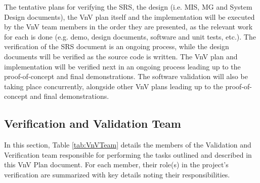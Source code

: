 \documentclass[12pt, titlepage]{article}
\begin{document}
The tentative plans for verifying the SRS, the design (i.e. MIS, MG and System Design documents), the VnV plan itself and the implementation will be executed by the VnV team members in the order they are presented, as the relevant work for each is done (e.g. demo, design documents, software and unit tests, etc.). The verification of the SRS document is an ongoing process, while the design documents will be verified as the source code is written. The VnV plan and implementation will be verified next in an ongoing process leading up to the proof-of-concept and final demonstrations. The software validation will also be taking place concurrently, alongside other VnV plans leading up to the proof-of-concept and final demonstrations.

\subsection{Verification and Validation Team}
In this section, Table \ref{tab:VnVTeam} details the members of the Validation and Verification team responsible for performing the tasks outlined and described in this VnV Plan document. For each member, their role(s) in the project's verification are summarized with key details noting their responsibilities.
\end{document}
